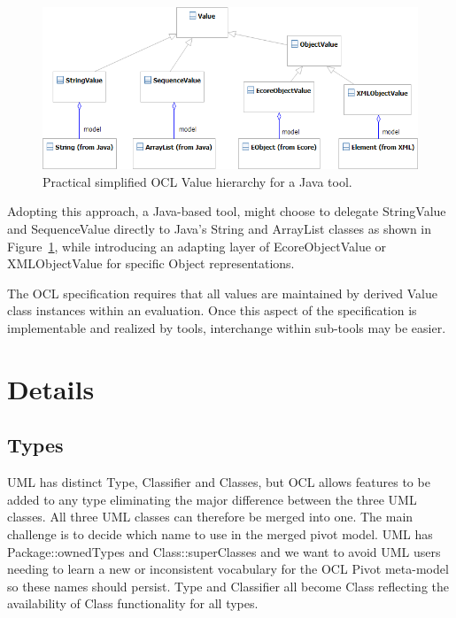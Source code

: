 \documentclass{eceasst}
\begin{document}
\begin{figure}
  \begin{center}
    \includegraphics[width=5.75in]{Value.png}
  \end{center}
  \caption{Practical simplified OCL Value hierarchy for a Java tool.}
  \label{fig:Value}
\end{figure}

Adopting this approach, a Java-based tool, might choose to delegate StringValue and SequenceValue directly to Java's String and ArrayList classes as shown in Figure~\ref{fig:Value}, while introducing an adapting layer of EcoreObjectValue or XMLObjectValue for specific Object representations.

The OCL specification requires that all values are maintained by derived Value class instances within an evaluation. Once this aspect of the specification is implementable and realized by tools, interchange within sub-tools may be easier. 

\section{Details}\label{Details}

\subsection{Types}

UML has distinct Type, Classifier and Classes, but OCL allows features to be added to any type eliminating the major difference between the three UML classes. All three UML classes can therefore be merged into one. The main challenge is to decide which name to use in the merged pivot model. UML has Package::ownedTypes and Class::superClasses and we want to avoid UML users needing to learn a new or inconsistent vocabulary for the OCL Pivot meta-model so these names should persist. Type and Classifier all become Class reflecting the availability of Class functionality for all types.
\end{document}
